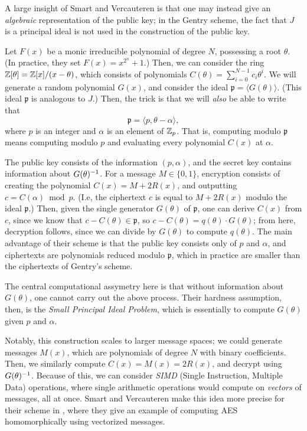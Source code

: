     A large insight of Smart and Vercauteren is that one may instead give an \emph{algebraic} representation of the public key; in the Gentry scheme, the fact that $J$ is a principal ideal is not used in the construction of the public key.

    Let $F(x)$ be a monic irreducible polynomial of degree $N$, possessing a root $\theta$. (In practice, they set $F(x) = x^{2^n} + 1$.) Then, we can consider the ring $\mathbb{Z}[\theta] = \mathbb{Z}[x] / (x - \theta)$, which consists of polynomials $C(\theta) = \sum_{i = 0}^{N-1} c_i \theta^i$. We will generate a random polynomial $G(x)$, and consider the ideal $\mathfrak{p} = \langle G(\theta) \rangle$. (This ideal $\mathfrak{p}$ is analogous to $J$.) Then, the trick is that we will \emph{also} be able to write that
    \[\mathfrak{p} = \langle p, \theta - \alpha \rangle, \]
    where $p$ is an integer and $\alpha$ is an element of $\mathbb{Z}_p$. That is, computing modulo $\mathfrak{p}$ means computing modulo $p$ and evaluating every polynomial $C(x)$ at $\alpha$.


    The public key consists of the information $(p, \alpha)$, and the secret key contains information about $G(\theta) ^{-1}$. For a message $M \in \{0, 1\}$, encryption consists of creating the polynomial $C(x) = M + 2 R(x)$, and outputting $c = C(\alpha) \bmod p$. (I.e, the ciphertext $c$ is equal to $M + 2R(x)$ modulo the ideal $\mathfrak{p}$.) Then, given the single generator $G(\theta)$ of $\mathfrak{p}$, one can derive $C(x)$ from $c$, since we know that $c - C(\theta) \in \mathfrak{p}$, so $c - C(\theta) = q(\theta) \cdot G(\theta)$; from here, decryption follows, since we can divide by $G(\theta)$ to compute $q(\theta)$. The main advantage of their scheme is that the public key consists only of $p$ and $\alpha$, and ciphertexts are polynomials reduced modulo $\mathfrak{p}$, which in practice are smaller than the ciphertexts of Gentry's scheme.

    The central computational assymetry here is that without information about $G(\theta)$, one cannot carry out the above process. Their hardness assumption, then, is the \emph{Small Principal Ideal Problem}, which is essentially to compute $G(\theta)$ given $p$ and $\alpha$.

    Notably, this construction scales to larger message spaces; we could generate messages $M(x)$, which are polynomials of degree $N$ with binary coefficients. Then, we similarly compute $C(x) = M(x) = 2 R(x)$, and decrypt using $G(\theta) ^{-1}$. Because of this, we can consider \emph{SIMD} (Single Instruction, Multiple Data) operations, where single arithmetic operations would compute on \emph{vectors} of messages, all at once. Smart and Vercauteren make this idea more precise for their scheme in \cite{SV09-2}, where they give an example of computing AES homomorphically using vectorized messages.

